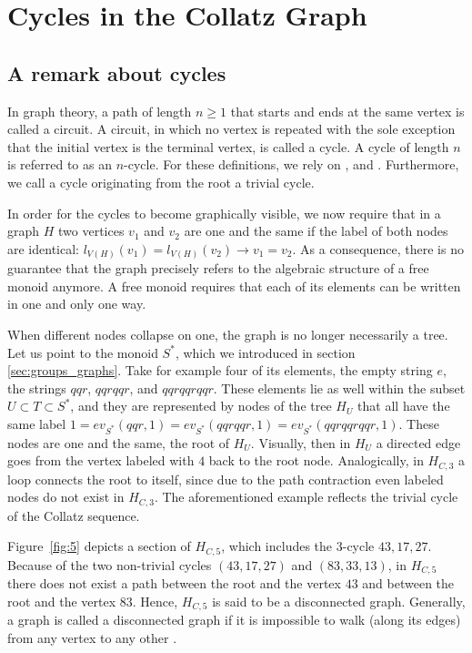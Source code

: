 \chapter{Cycles in the Collatz Graph}
\label{ch:cycles}

\section{A remark about cycles}
\label{sec:cycles}
In graph theory, a path of length $n\geq 1$ that starts and ends at the same vertex is called a circuit. A circuit, in which no vertex is repeated with the sole exception that the initial vertex is the terminal vertex, is called a cycle. A cycle of length $n$ is referred to as an $n$-cycle. For these definitions, we rely on \cite[p.~599]{Ref_Rosen}, \cite[p.~35]{Ref_Benjamin_Chartrand_Zhang} and \cite[p.~445]{Ref_Chartrand_Zhang}. Furthermore, we call a cycle originating from the root a trivial cycle.

\begin{remark}
In order for the cycles to become graphically visible, we now require that in a graph $H$ two vertices $v_1$ and $v_2$ are one and the same if the label of both nodes are identical: $l_{V(H)}(v_1)=l_{V(H)}(v_2)\rightarrow v_1=v_2$. As a consequence, there is no guarantee that the graph precisely refers to the algebraic structure of a free monoid anymore. A free monoid requires that each of its elements can be written in one and only one way.
\end{remark}

When different nodes collapse on one, the graph is no longer necessarily a tree. Let us point to the monoid $S^\ast$, which we introduced in section \ref{sec:groups_graphs}. Take for example four of its elements, the empty string $e$, the strings $qqr$, $qqrqqr$, and $qqrqqrqqr$. These elements lie as well within the subset $U\subset T\subset S^\ast$, and they are represented by nodes of the tree $H_U$ that all have the same label $1=ev_{S^\ast}(qqr,1)=ev_{S^\ast}(qqrqqr,1)=ev_{S^\ast}(qqrqqrqqr,1)$. These nodes are one and the same, the root of $H_U$. Visually, then in $H_U$ a directed edge goes from the vertex labeled with $4$ back to the root node. Analogically, in $H_{C,3}$ a loop connects the root to itself, since due to the path contraction even labeled nodes do not exist in $H_{C,3}$. The  aforementioned example reflects the trivial cycle of the Collatz sequence.

Figure~\ref{fig:5} depicts a section of $H_{C,5}$, which includes the $3$-cycle $43,17,27$. Because of the two non-trivial cycles $(43,17,27)$ and $(83,33,13)$, in $H_{C,5}$ there does not exist a path between the root and the vertex $43$ and between the root and the vertex $83$. Hence, $H_{C,5}$ is said to be a disconnected graph. Generally, a graph is called a disconnected graph if it is impossible to walk (along its edges) from any vertex to any other \cite[pp.~46-47]{Ref_Benjamin_Chartrand_Zhang}.

